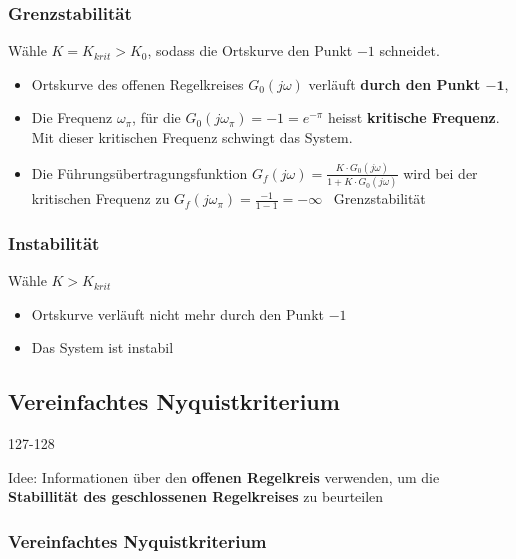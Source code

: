 \subsubsection{Grenzstabilität}

Wähle $K = K_{krit} > K_0$, sodass die Ortskurve den Punkt $-1$ schneidet.
\vspace{0.1cm}
\begin{itemize}
    \item Ortskurve des offenen Regelkreises $G_0(j \omega)$ verläuft \textbf{durch den Punkt $\boldsymbol{-1}$}, 
    \item Die Frequenz $\omega_{\pi}$, für die $G_0(j \omega_{\pi})= -1 = e^{- \pi}$ heisst \textbf{kritische Frequenz}. Mit dieser 
        kritischen Frequenz schwingt das System.
    \item Die Führungsübertragungsfunktion $G_f(j \omega) = \frac { K \cdot G_0(j \omega)}{1 + K \cdot G_0(j \omega)}$ wird bei 
    der kritischen Frequenz zu $G_f(j \omega_{\pi}) = \frac{-1}{1-1} = - \infty $ \textrightarrow\ Grenzstabilität
\end{itemize}


\subsubsection{Instabilität}

Wähle $K > K_{krit}$
\vspace{0.1cm}
\begin{itemize}
    \item Ortskurve verläuft nicht mehr durch den Punkt $-1$
    \item Das System ist instabil
\end{itemize}


\subsection{Vereinfachtes Nyquistkriterium}{127-128}

Idee: Informationen über den \textbf{offenen Regelkreis} verwenden, um die \textbf{Stabillität des geschlossenen Regelkreises} 
zu beurteilen


\subsubsection{Vereinfachtes Nyquistkriterium}

